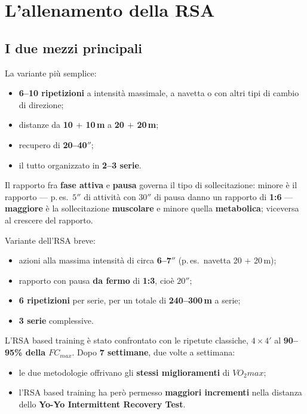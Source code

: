\section{L'allenamento della RSA}

\subsection{I due mezzi principali}

La variante più semplice:

\begin{itemize}
  \item \textbf{6--10 ripetizioni} a intensità massimale, a navetta o con altri tipi di cambio di
    direzione;
  \item distanze da \textbf{10 $+$ 10\,m} a \textbf{20 $+$ 20\,m};
  \item recupero di \textbf{20--40$''$};
  \item il tutto organizzato in \textbf{2--3 serie}.
\end{itemize}

Il rapporto fra \textbf{fase attiva} e \textbf{pausa} governa il tipo di sollecitazione: minore è il
rapporto --- p.\,es.\ $5''$ di attività con $30''$ di pausa danno un rapporto di \textbf{1:6} ---
\textbf{maggiore} è la sollecitazione \textbf{muscolare} e minore quella \textbf{metabolica};
viceversa al crescere del rapporto.

Variante dell'RSA breve:

\begin{itemize}
  \item azioni alla massima intensità di circa \textbf{6--7$''$} (p.\,es.\ navetta 20 $+$ 20\,m);
  \item rapporto con pausa \textbf{da fermo} di \textbf{1:3}, cioè $20''$;
  \item \textbf{6 ripetizioni} per serie, per un totale di \textbf{240--300\,m} a serie;
  \item \textbf{3 serie} complessive.
\end{itemize}

L'RSA based training è stato confrontato con le ripetute classiche, $4 \times 4'$ al
\textbf{90--95\% della $FC_{max}$}. Dopo \textbf{7 settimane}, due volte a settimana:

\begin{itemize}
  \item le due metodologie offrivano gli \textbf{stessi miglioramenti} di $VO_2max$;
  \item l'RSA based training ha però permesso \textbf{maggiori incrementi} nella distanza dello
    \textbf{Yo-Yo Intermittent Recovery Test}.
\end{itemize}

